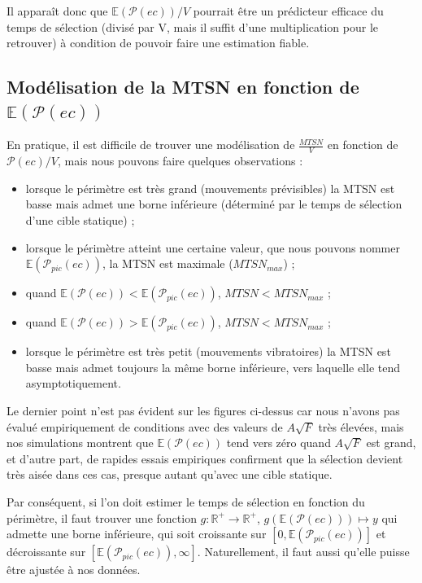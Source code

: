 	Il apparaît donc que $\mathbb{E}(\mathcal{P}(ec))/V$ pourrait être un prédicteur efficace du temps de sélection (divisé par V, mais il suffit d'une multiplication pour le retrouver) à condition de pouvoir faire une estimation fiable.
	
	\subsection{Modélisation de la MTSN en fonction \texorpdfstring{de $\mathbb{E}(\mathcal{P}(ec))$}{du périmètre}}
	En pratique, il est difficile de trouver une modélisation de $\frac{MTSN}{V}$ en fonction de $\mathcal{P}(ec)/V$, mais nous pouvons faire quelques observations :
	
	\begin{itemize}
		\item lorsque le périmètre est très grand (mouvements prévisibles) la MTSN est basse mais admet une borne inférieure (déterminé par le temps de sélection d'une cible statique) ;
		\item lorsque le périmètre atteint une certaine valeur, que nous pouvons nommer $\mathbb{E}(\mathcal{P}_{pic}(ec))$, la MTSN est maximale ($MTSN_{max}$) ;
		\item quand $\mathbb{E}(\mathcal{P}(ec)) < \mathbb{E}(\mathcal{P}_{pic}(ec))$, $MTSN < MTSN_{max}$ ;
		\item quand $\mathbb{E}(\mathcal{P}(ec)) > \mathbb{E}(\mathcal{P}_{pic}(ec))$, $MTSN < MTSN_{max}$ ;
		\item lorsque le périmètre est très petit (mouvements vibratoires) la MTSN est basse mais admet toujours la même borne inférieure, vers laquelle elle tend asymptotiquement.
	\end{itemize}
	
	Le dernier point n'est pas évident sur les figures ci-dessus car nous n'avons pas évalué empiriquement de conditions avec des valeurs de $A\sqrt{F}$ très élevées, mais nos simulations montrent que $\mathbb{E}(\mathcal{P}(ec))$ tend vers zéro quand $A\sqrt{F}$ est grand, et d'autre part, de rapides essais empiriques confirment que la sélection devient très aisée dans ces cas, presque autant qu'avec une cible statique.
	
	Par conséquent, si l'on doit estimer le temps de sélection en fonction du périmètre, il faut trouver une fonction $g : \mathbb{R}^{+} \to \mathbb{R}^{+}$, $g\left(\mathbb{E}(\mathcal{P}(ec))\right) \mapsto y$ qui admette une borne inférieure, qui soit croissante sur $[0, \mathbb{E}(\mathcal{P}_{pic}(ec))]$ et décroissante sur $[\mathbb{E}(\mathcal{P}_{pic}(ec)), \infty]$. Naturellement, il faut aussi qu'elle puisse être ajustée à nos données.
	
